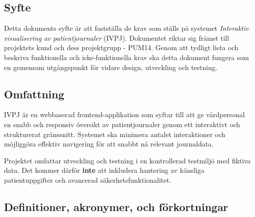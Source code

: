 \documentclass{article}
\begin{document}
\subsection{Syfte}
Detta dokuments syfte är att fastställa de krav som ställs på systemet 
\textit{Interaktiv visualisering av patientjournaler} (IVPJ).  
Dokumentet riktar sig främst till projektets kund och dess projektgrupp - PUM14. Genom att tydligt lista och beskriva funktionella och icke-funktionella krav ska detta dokument fungera som en gemensam utgångspunkt för vidare design, utveckling och testning.

\subsection{Omfattning}
IVPJ är en webbaserad frontend-applikation som syftar till att ge vårdpersonal en snabb och responsiv översikt av patientjournaler genom ett interaktivt och strukturerat gränssnitt. Systemet ska minimera antalet interaktioner och möjliggöra effektiv navigering för att snabbt nå relevant journaldata.

Projektet omfattar utveckling och testning i en kontrollerad testmiljö med fiktiva data.  
Det kommer därför \textbf{inte} att inkludera hantering av känsliga patientuppgifter och avancerad säkerhetsfunktionalitet. 

\subsection{Definitioner, akronymer, och förkortningar}
\end{document}
